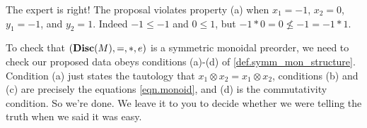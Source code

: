 \documentclass[7Sketches]{subfiles}
\begin{document}
{
The expert is right! The proposal violates property (a) when $x_1 = -1$,
$x_2=0$, $y_1=-1$, and $y_2=1$. Indeed $-1 \leq -1$ and $0 \leq 1$, but $-1*0 =
0\not\leq -1 = -1*1$.
}

{
  To check that $(\mathbf{Disc}(M),=,*,e)$ is a symmetric monoidal preorder, we need to check our proposed data obeys conditions (a)-(d) of \cref{def.symm_mon_structure}. Condition (a) just states the tautology that $x_1 \otimes x_2 = x_1 \otimes x_2$, conditions (b) and (c) are precisely the equations \cref{eqn.monoid}, and (d) is the commutativity condition. So we're done. We leave it to you to decide whether we were telling the truth when we said it was easy.
}
\end{document}
